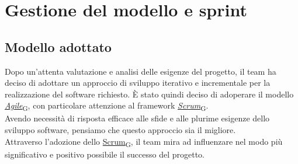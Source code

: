 
\section{Gestione del modello e sprint}
\subsection{Modello adottato}
Dopo un'attenta valutazione e analisi delle esigenze del progetto, il team ha deciso di adottare un approccio di sviluppo iterativo e incrementale per la realizzazione del software richiesto. È stato quindi deciso di adoperare il modello \href{https://7last.github.io/docs/pb/documentazione-interna/glossario\#agile}{\textit{Agile}\textsubscript{G}}, con particolare attenzione al framework \href{https://7last.github.io/docs/pb/documentazione-interna/glossario\#scrum}{\textit{Scrum}\textsubscript{G}}.\\
Avendo necessità di risposta efficace alle sfide e alle plurime esigenze dello sviluppo software, pensiamo che questo approccio sia il migliore.\\
Attraverso l'adozione dello \href{https://7last.github.io/docs/pb/documentazione-interna/glossario\#scrum}{Scrum\textsubscript{G}}, il team mira ad influenzare nel modo più significativo e positivo possibile il successo del progetto.

